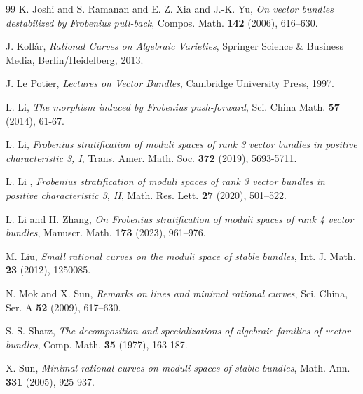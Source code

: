 \documentclass{kms-b}
\numberwithin{equation}{section}
\theoremstyle{plain}
\theoremstyle{definition}
\theoremstyle{remark}
\begin{document}
\begin{thebibliography}{99}
 K. Joshi and S. Ramanan and E. Z. Xia and J.-K. Yu, {\it On vector bundles destabilized by Frobenius pull-back}, Compos. Math. {\bf 142} (2006), 616--630.

 J. Kollár, {\it Rational Curves on Algebraic Varieties}, Springer Science \& Business Media, Berlin/Heidelberg, 2013.

 J. Le Potier, {\it Lectures on Vector Bundles}, Cambridge University Press, 1997.

 L. Li, {\it The morphism induced by Frobenius push-forward}, Sci. China Math. {\bf 57} (2014), 61-67.

 L. Li, {\it Frobenius stratification of moduli spaces of rank 3 vector bundles in positive characteristic 3, I}, Trans. Amer. Math. Soc. {\bf 372} (2019), 5693-5711.

 L. Li , {\it Frobenius stratification of moduli spaces of rank 3 vector bundles in positive characteristic 3, II}, Math. Res. Lett. {\bf 27} (2020), 501–522.

 L. Li and H. Zhang, {\it On Frobenius stratification of moduli spaces of rank 4
vector bundles}, Manuscr. Math. {\bf 173} (2023), 961–976.

 M. Liu, {\it Small rational curves on the moduli space of stable bundles}, Int. J. Math. {\bf 23} (2012), 1250085.

 N. Mok and X. Sun, {\it Remarks on lines and minimal rational curves}, Sci. China, Ser. A {\bf 52}  (2009), 617–630.

 S. S. Shatz, {\it The decomposition and specializations of algebraic families of vector bundles}, Comp. Math. {\bf 35} (1977), 163-187.

 X. Sun, {\it Minimal rational curves on moduli spaces of stable bundles}, Math. Ann. {\bf 331} (2005), 925-937.

\end{thebibliography}
\end{document}
